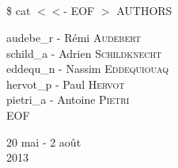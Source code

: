 \begin{titlepage}
    \begin{center}
        \textsc{\Large \reportsubject}\\[0.5cm]
        \HRule \\[0.4cm]
        {\huge \bfseries \reporttitle}\\[0.4cm]
        \HRule \\[1.5cm]
        \begin{minipage}[t]{0.8\textwidth}
                \huge \$ cat $<<$- EOF $>$ AUTHORS
        \end{minipage}

        \bigskip

        \begin{minipage}[t]{0.6\textwidth}
            \begin{flushleft} \large
                audebe\_r - Rémi \textsc{Audebert} \\
                schild\_a - Adrien \textsc{Schildknecht} \\
                eddequ\_n - Nassim \textsc{Eddequiouaq} \\
                hervot\_p - Paul \textsc{Hervot} \\
                pietri\_a - Antoine \textsc{Pietri} \\
                EOF \\
            \end{flushleft}
        \end{minipage}
        \vfill

        {\large 20 mai - 2 août \\ 2013}

    \end{center}

\end{titlepage}
